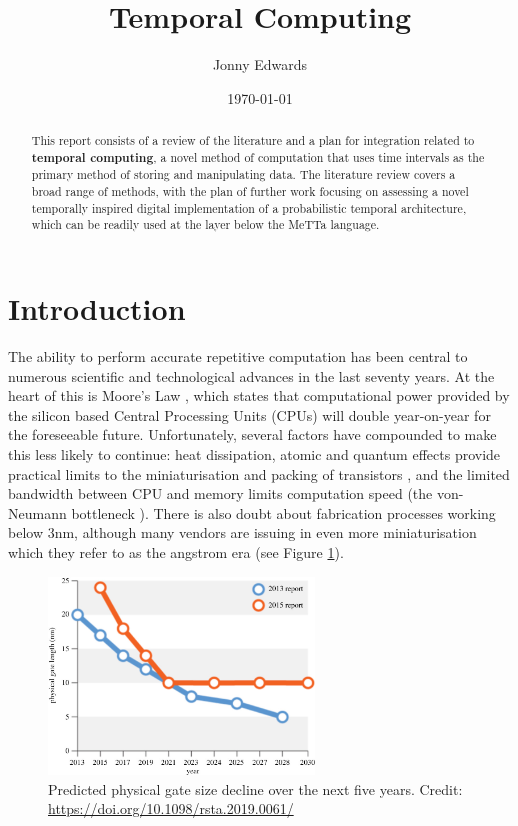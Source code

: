 \documentclass{article}
\title{Temporal Computing}
\author{Jonny Edwards}
\date{\today}
\begin{document}
\maketitle
\begin{abstract}
	This report consists of a review of the literature and a plan for integration related to \textbf{temporal computing}, a novel method of computation that uses time intervals as the primary method of storing and manipulating data. The literature review covers a broad range of methods, with the plan of further work focusing on assessing a novel temporally inspired digital implementation of a probabilistic temporal architecture, which can be readily used at the layer below the MeTTa language.
\end{abstract}

\section{Introduction}
The ability to perform accurate repetitive computation has been central to numerous scientific and technological advances in the last seventy years. At the heart of this is Moore's Law \cite{Moore:2000:CMC:333067.333074}, which states that computational power provided by the silicon based Central Processing Units (CPUs) will double year-on-year for the foreseeable future. Unfortunately, several factors have compounded to make this less likely to continue: heat dissipation, atomic and quantum effects provide practical limits to the miniaturisation and packing of transistors \cite{moorefail}, and the limited bandwidth between CPU and memory limits computation speed (the von-Neumann bottleneck \cite{Backus:1978:PLV:359576.359579}). There is also doubt about  fabrication processes working below 3nm, although many vendors are issuing in even more miniaturisation which they refer to as the angstrom era (see Figure \ref{fig:intel}).


\begin{figure}[ht]
	\centering
	\includegraphics[width=200pt]{figures/intel2.jpg}
	\caption{Predicted physical gate size decline over the next five years. Credit: \url{https://doi.org/10.1098/rsta.2019.0061/}}
	\label{fig:intel}
\end{figure}
\end{document}
